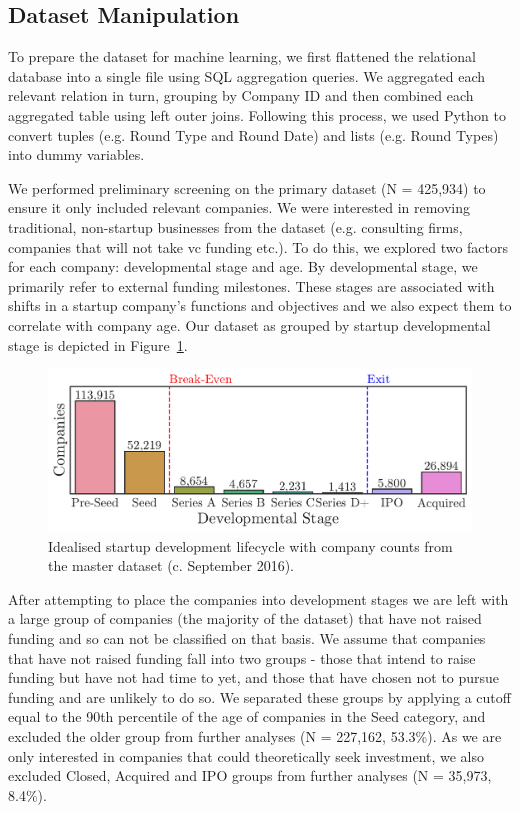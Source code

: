 \documentclass[../thesis/thesis.tex]{subfiles}
\begin{document}
\subsection{Dataset Manipulation}

To prepare the dataset for machine learning, we first flattened the relational database into a single file using SQL aggregation queries. We aggregated each relevant relation in turn, grouping by Company ID and then combined each aggregated table using left outer joins. Following this process, we used Python to convert tuples (e.g. Round Type and Round Date) and lists (e.g. Round Types) into dummy variables.

We performed preliminary screening on the primary dataset (N = 425,934) to ensure it only included relevant companies. We were interested in removing traditional, non-startup businesses from the dataset (e.g. consulting firms, companies that will not take \gls{vc} funding etc.). To do this, we explored two factors for each company: developmental stage and age. By developmental stage, we primarily refer to external funding milestones. These stages are associated with shifts in a startup company's functions and objectives and we also expect them to correlate with company age. Our dataset as grouped by startup developmental stage is depicted in Figure~\ref{fig:design:lifecycle}.

\begin{figure}[!htb]
    \centering
    \includegraphics[width=\textwidth]{../figures/design/descriptives_counts_stage}
    \caption[Startup development lifecyle]{Idealised startup development lifecycle with company counts from the master dataset (c. September 2016).}
    \label{fig:design:lifecycle}
\end{figure}

After attempting to place the companies into development stages we are left with a large group of companies (the majority of the dataset) that have not raised funding and so can not be classified on that basis. We assume that companies that have not raised funding fall into two groups - those that intend to raise funding but have not had time to yet, and those that have chosen not to pursue funding and are unlikely to do so. We separated these groups by applying a cutoff equal to the 90th percentile of the age of companies in the Seed category, and excluded the older group from further analyses (N = 227,162,  53.3\%). As we are only interested in companies that could theoretically seek investment, we also excluded Closed, Acquired and IPO groups from further analyses (N = 35,973, 8.4\%).
\end{document}
